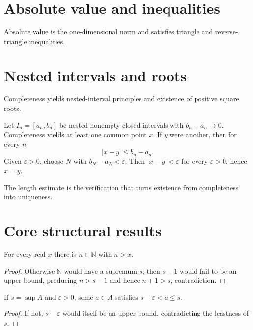 \section{Absolute value and inequalities}
Absolute value is the one-dimensional norm and satisfies triangle and reverse-triangle inequalities.

\section{Nested intervals and roots}
Completeness yields nested-interval principles and existence of positive square roots.


\begin{example}\label{ex:ii01-expand-03}
Let \(I_n=[a_n,b_n]\) be nested nonempty closed intervals with
\(b_n-a_n\to0\). Completeness yields at least one common point \(x\). If \(y\)
were another, then for every \(n\)
\[
|x-y|\le b_n-a_n.
\]
Given \(\varepsilon>0\), choose \(N\) with \(b_N-a_N<\varepsilon\). Then
\(|x-y|<\varepsilon\) for every \(\varepsilon>0\), hence \(x=y\).

The length estimate is the verification that turns existence from completeness
into uniqueness.
\end{example}
\section{Core structural results}

\begin{theorem}\label{thm:ii01-01}
For every real $x$ there is $n\in\mathbb N$ with $n>x$.
\begin{proof}
Otherwise $\mathbb N$ would have a supremum $s$; then $s-1$ would fail to be an upper bound, producing $n>s-1$ and hence $n+1>s$, contradiction.
\end{proof}
\end{theorem}

\begin{theorem}\label{thm:ii01-02}
If $s=\sup A$ and $\varepsilon>0$, some $a\in A$ satisfies $s-\varepsilon<a\le s$.
\begin{proof}
If not, $s-\varepsilon$ would itself be an upper bound, contradicting the leastness of $s$.
\end{proof}
\end{theorem}

